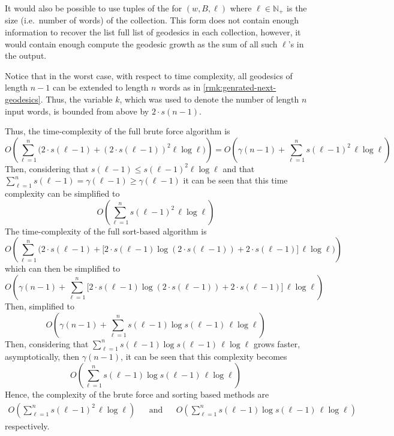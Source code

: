\begin{remark}
	It would also be possible to use tuples of the for $(w,B,\ell)$ where $\ell\in \mathbb{N}_+$ is the size (i.e.\ number of words) of the collection.
	This form does not contain enough information to recover the list full list of geodesics in each collection, however, it would contain enough compute the geodesic growth as the sum of all such $\ell$'s in the output.
	\thmendmark
\end{remark}

Notice that in the worst case, with respect to time complexity, all geodesics of length $n-1$ can be extended to length $n$ words as in \cref{rmk:genrated-next-geodesics}.
Thus, the variable $k$, which was used to denote the number of length $n$ input words, is bounded from above by $2 \cdot s(n-1)$.

Thus, the time-complexity of the full brute force algorithm is
\[
  O\left(
    \sum_{\ell = 1}^n \Big( 2 \cdot s(\ell-1) + (2 \cdot s(\ell-1))^2 \ell \log \ell \Big)
  \right)
  =
  O\left(
    \gamma(n-1)
    +
    \sum_{\ell=1}^n s(\ell-1)^2 \, \ell \log \ell
  \right)
\]
Then, considering that $s(\ell-1) \leq s(\ell-1)^2 \ell \log \ell$ and that $\sum_{\ell=1}^n s(\ell-1) = \gamma(\ell-1)\geq \gamma(\ell-1)$ it can be seen that this time complexity can be simplified to
\[
  O\left(
    \sum_{\ell=1}^n s(\ell-1)^2 \, \ell \log \ell
  \right)
\]
The time-complexity of the full sort-based algorithm is
\[
  O\left(
    \sum_{\ell = 1}^n \Big(
        2 \cdot s(\ell-1)
        +
        \big[2 \cdot s(\ell-1)\log (2 \cdot s(\ell-1)) + 2 \cdot s(\ell-1)\big] \, \ell \log \ell 
    \Big)
  \right)
\]
which can then be simplified to
\[
	O\left(
	\gamma(n-1)
	+
	\sum_{\ell = 1}^n
	\big[2 \cdot s(\ell-1)\log (2 \cdot s(\ell-1)) + 2 \cdot s(\ell-1)\big] \, \ell \log \ell
	\right)
\]
Then, simplified to
\[
O\left(
\gamma(n-1)
+
\sum_{\ell = 1}^n s(\ell-1) \log s(\ell-1) \, \ell \log \ell
\right)
\]
Then, considering that $\sum_{\ell = 1}^n s(\ell-1) \log s(\ell-1) \, \ell \log \ell$ grows faster, asymptotically, then $\gamma(n-1)$, it can be seen that this complexity becomes
\[
O\left(
\sum_{\ell = 1}^n s(\ell-1) \log s(\ell-1)  \, \ell \log \ell
\right)
\]
Hence, the complexity of the brute force and sorting based methods are
\begin{align*}
  O\left(
  \sum_{\ell=1}^n s(\ell-1)^2 \, \ell \log \ell
  \right)
  &&\text{and}&&
  O\left(
  \sum_{\ell = 1}^n s(\ell-1) \log s(\ell-1) \, \ell \log \ell
  \right)
\end{align*}
respectively.

